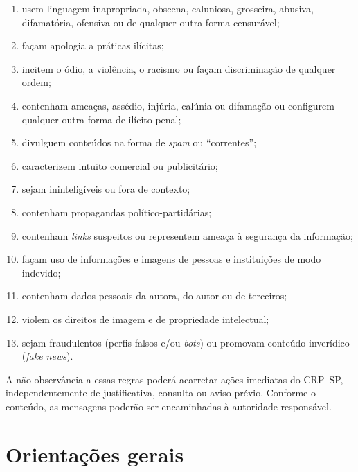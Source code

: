 \begin{enumerate}
\begin{enumerate}
          \item
                usem linguagem inapropriada, obscena, caluniosa, grosseira, abusiva,
                difamatória, ofensiva ou de qualquer outra forma censurável;
          \item
                façam apologia a práticas ilícitas;
          \item
                incitem o ódio, a violência, o racismo ou façam discriminação de
                qualquer ordem;
          \item
                contenham ameaças, assédio, injúria, calúnia ou difamação ou
                configurem qualquer outra forma de ilícito penal;
          \item
                divulguem conteúdos na forma de \emph{spam} ou ``correntes'';
          \item
                caracterizem intuito comercial ou publicitário;
          \item
                sejam ininteligíveis ou fora de contexto;
          \item
                contenham propagandas político-partidárias;
          \item
                contenham \emph{links} suspeitos ou representem ameaça à segurança
                da informação;
          \item
                façam uso de informações e imagens de pessoas e instituições de modo
                indevido;
          \item
                contenham dados pessoais da autora, do autor ou de terceiros;
          \item
                violem os direitos de imagem e de propriedade intelectual;
          \item
                sejam fraudulentos (perfis falsos e/ou \emph{bots}) ou promovam
                conteúdo inverídico (\emph{fake news}).
        \end{enumerate}
\end{enumerate}

A não observância a essas regras poderá acarretar ações imediatas do
CRP~SP, independentemente de justificativa, consulta ou aviso prévio.
Conforme o conteúdo, as mensagens poderão ser encaminhadas à autoridade
responsável.

\section{Orientações gerais}

